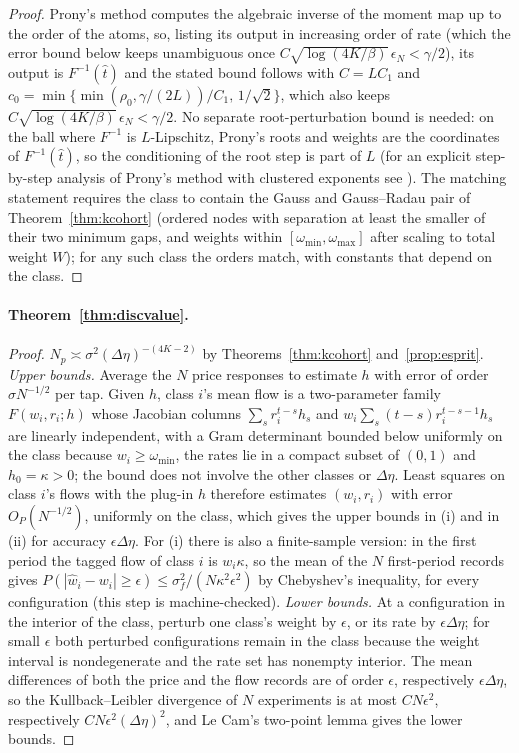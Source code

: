 \documentclass[12pt]{article}
\theoremstyle{definition}
\theoremstyle{remark}
\begin{document}
\begin{proof}
Prony's method computes the algebraic inverse of the moment map up to the order of the atoms, so, listing its output in increasing order of rate (which the error bound below keeps unambiguous once $C\sqrt{\log(4K/\beta)}\,\epsilon_N<\gamma/2$), its output is $F^{-1}(\hat t)$ and the stated bound follows with $C=LC_1$ and $c_0=\min\{\min(\rho_0,\gamma/(2L))/C_1,\,1/\sqrt2\}$, which also keeps $C\sqrt{\log(4K/\beta)}\,\epsilon_N<\gamma/2$. No separate root-perturbation bound is needed: on the ball where $F^{-1}$ is $L$-Lipschitz, Prony's roots and weights are the coordinates of $F^{-1}(\hat t)$, so the conditioning of the root step is part of $L$ (for an explicit step-by-step analysis of Prony's method with clustered exponents see \citealp{katz2023}). The matching statement requires the class to contain the Gauss and Gauss--Radau pair of Theorem~\ref{thm:kcohort} (ordered nodes with separation at least the smaller of their two minimum gaps, and weights within $[\omega_{\min},\omega_{\max}]$ after scaling to total weight $W$); for any such class the orders match, with constants that depend on the class.
\end{proof}
\paragraph{Theorem~\ref{thm:discvalue}.}
\begin{proof}
$N_p\asymp\sigma^2(\Delta\eta)^{-(4K-2)}$ by Theorems~\ref{thm:kcohort} and~\ref{prop:esprit}. \emph{Upper bounds.} Average the $N$ price responses to estimate $h$ with error of order $\sigma N^{-1/2}$ per tap. Given $h$, class $i$'s mean flow is a two-parameter family $F(w_i,r_i;h)$ whose Jacobian columns $\sum_sr_i^{t-s}h_s$ and $w_i\sum_s(t-s)r_i^{t-s-1}h_s$ are linearly independent, with a Gram determinant bounded below uniformly on the class because $w_i\ge\omega_{\min}$, the rates lie in a compact subset of $(0,1)$ and $h_0=\kappa>0$; the bound does not involve the other classes or $\Delta\eta$. Least squares on class $i$'s flows with the plug-in $h$ therefore estimates $(w_i,r_i)$ with error $O_P(N^{-1/2})$, uniformly on the class, which gives the upper bounds in (i) and in (ii) for accuracy $\epsilon\Delta\eta$. For (i) there is also a finite-sample version: in the first period the tagged flow of class $i$ is $w_i\kappa$, so the mean of the $N$ first-period records gives $P(|\hat w_i-w_i|\ge\epsilon)\le\sigma_f^2/(N\kappa^2\epsilon^2)$ by Chebyshev's inequality, for every configuration (this step is machine-checked). \emph{Lower bounds.} At a configuration in the interior of the class, perturb one class's weight by $\epsilon$, or its rate by $\epsilon\Delta\eta$; for small $\epsilon$ both perturbed configurations remain in the class because the weight interval is nondegenerate and the rate set has nonempty interior. The mean differences of both the price and the flow records are of order $\epsilon$, respectively $\epsilon\Delta\eta$, so the Kullback--Leibler divergence of $N$ experiments is at most $CN\epsilon^2$, respectively $CN\epsilon^2(\Delta\eta)^2$, and Le Cam's two-point lemma gives the lower bounds.
\end{proof}
\end{document}
